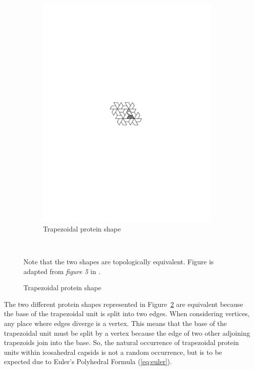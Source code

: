 \documentclass[12pt,letter]{article}
\begin{document}
\begin{figure}[h]
\begin{subfigure}[h]{0.35\textwidth}
		\includegraphics[width = \textwidth]{tile_trap.pdf}
		\caption{Trapezoidal protein shape}
		\label{fig:tile_trap}
	\end{subfigure} \\
	\begin{minipage}[h]{.75\textwidth}
		\begin{footnotesize}
			Note that the two shapes are topologically equivalent. Figure is adapted from \textit{figure 5} in \cite{Mannige:2008}.
		\end{footnotesize}
	\end{minipage}
	\label{fig:tiles}
\end{figure}

The two different protein shapes represented in Figure~\ref{fig:tiles} are equivalent because the base of the trapezoidal unit is split into two edges. When considering vertices, any place where edges diverge is a vertex. This means that the base of the trapezoidal unit must be split by a vertex because the edge of two other adjoining trapezoids join into the base. So, the natural occurrence of trapezoidal protein units within icosahedral capsids is not a random occurrence, but is to be expected due to Euler's Polyhedral Formula (\ref{eq:euler}).
\end{document}
